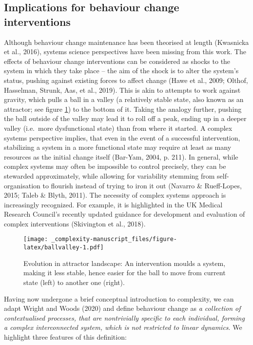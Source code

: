 \documentclass[
  british,
  man,floatsintext]{apa6}
\begin{document}
\hypertarget{implications-for-behaviour-change-interventions}{%
\subsection{Implications for behaviour change interventions}\label{implications-for-behaviour-change-interventions}}

Although behaviour change maintenance has been theorised at length (Kwasnicka et al., 2016), systems science perspectives have been missing from this work. The effects of behaviour change interventions can be considered as shocks to the system in which they take place -- the aim of the shock is to alter the system's status, pushing against existing forces to affect change (Hawe et al., 2009; Olthof, Hasselman, Strunk, Aas, et al., 2019). This is akin to attempts to work against gravity, which pulls a ball in a valley (a relatively stable state, also known as an attractor; see figure \ref{fig:ballvalley}) to the bottom of it. Taking the analogy further, pushing the ball outside of the valley may lead it to roll off a peak, ending up in a deeper valley (i.e.~more dysfunctional state) than from where it started. A complex systems perspective implies, that even in the event of a successful intervention, stabilizing a system in a more functional state may require at least as many resources as the initial change itself (Bar-Yam, 2004, p. 211). In general, while complex systems may often be impossible to control precisely, they can be stewarded approximately, while allowing for variability stemming from self-organisation to flourish instead of trying to iron it out (Navarro \& Rueff-Lopes, 2015; Taleb \& Blyth, 2011). The necessity of complex systems approach is increasingly recognized. For example, it is highlighted in the UK Medical Research Council's recently updated guidance for development and evaluation of complex interventions (Skivington et al., 2018).

\begin{figure}
\centering
\texttt{[image: \_complexity-manuscript\_files/figure-latex/ballvalley-1.pdf]}
\caption{\label{fig:ballvalley}Evolution in attractor landscape: An intervention moulds a system, making it less stable, hence easier for the ball to move from current state (left) to another one (right).}
\end{figure}

Having now undergone a brief conceptual introduction to complexity, we can adapt Wright and Woods (2020) and define behaviour change as \emph{a collection of contextualised processes, that are nontrivially specific to each individual, forming a complex interconnected system, which is not restricted to linear dynamics}. We highlight three features of this definition:
\end{document}
